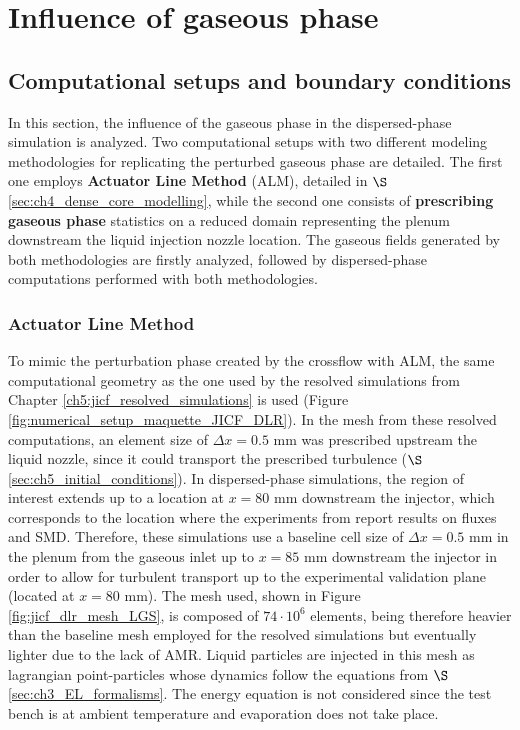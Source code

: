 \clearpage


\section{Influence of gaseous phase}
\label{sec:SLI_LGS_gaseous_phase_effect}


\subsection{Computational setups and boundary conditions}
\label{sec:ch6_BC_gaseous_phase}

In this section, the influence of the gaseous phase in the dispersed-phase simulation is analyzed. Two computational setups with two different modeling methodologies for replicating the perturbed gaseous phase are detailed. The first one employs \textbf{Actuator Line Method} (ALM), detailed in $\S$\ref{sec:ch4_dense_core_modelling}, while the second one consists of \textbf{prescribing gaseous phase} statistics on a reduced domain representing the plenum downstream the liquid injection nozzle location. The gaseous fields generated by both methodologies are firstly analyzed, followed by dispersed-phase computations performed with both methodologies.


\subsubsection*{Actuator Line Method}



To mimic the perturbation phase created by the crossflow with ALM, the same computational geometry as the one used by the resolved simulations from Chapter \ref{ch5:jicf_resolved_simulations} is used (Figure \ref{fig:numerical_setup_maquette_JICF_DLR}).    In the mesh from these resolved computations, an element size of $\Delta x = 0.5$ mm was prescribed upstream the liquid nozzle, since it could transport the prescribed turbulence ($\S$\ref{sec:ch5_initial_conditions}). In dispersed-phase simulations, the region of interest extends up to a location at $x = 80$ mm downstream the injector, which corresponds to the location where the experiments from  report results on fluxes and SMD. Therefore, these simulations use a baseline cell size of $\Delta x = 0.5$ mm in the plenum from the gaseous inlet up to $x = 85$ mm downstream the injector in order to allow for turbulent transport up to the experimental validation plane (located at $x = 80$ mm). The mesh used, shown in Figure \ref{fig:jicf_dlr_mesh_LGS}, is composed of $74 \cdot 10^6$ elements, being therefore heavier than the baseline mesh employed for the resolved simulations but eventually lighter due to the lack of AMR. Liquid particles are injected in this mesh as lagrangian point-particles whose dynamics follow the equations from  $\S$\ref{sec:ch3_EL_formalisms}. The energy equation is not considered since the test bench is at ambient temperature and evaporation does not take place.


